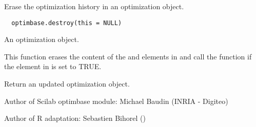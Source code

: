 %
\begin{Description}\relax
Erase the optimization history in an optimization object.
\end{Description}
%
\begin{Usage}
\begin{verbatim}
  optimbase.destroy(this = NULL)
\end{verbatim}
\end{Usage}
%
\begin{Arguments}
\begin{ldescription}
\item[\code{this}] An optimization object.
\end{ldescription}
\end{Arguments}
%
\begin{Details}\relax
This function erases the content of the  and
 elements in  and call the 
 function if the  element in
 is set to TRUE.
\end{Details}
%
\begin{Value}
Return an updated optimization object.
\end{Value}
%
\begin{Author}\relax
Author of Scilab optimbase module: Michael Baudin (INRIA - Digiteo)

Author of R adaptation: Sebastien Bihorel ()
\end{Author}
%
\begin{SeeAlso}\relax
{}
\end{SeeAlso}

